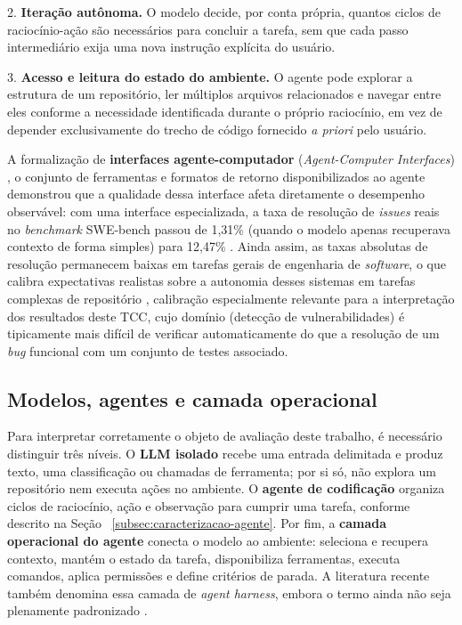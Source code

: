 2. \textbf{Iteração autônoma.} O modelo decide, por conta própria, quantos ciclos de raciocínio-ação são necessários para concluir a tarefa, sem que cada passo intermediário exija uma nova instrução explícita do usuário.

3. \textbf{Acesso e leitura do estado do ambiente.} O agente pode explorar a estrutura de um repositório, ler múltiplos arquivos relacionados e navegar entre eles conforme a necessidade identificada durante o próprio raciocínio, em vez de depender exclusivamente do trecho de código fornecido \textit{a priori} pelo usuário.

A formalização de \textbf{interfaces agente-computador} (\textit{Agent-Computer Interfaces}) , o conjunto de ferramentas e formatos de retorno disponibilizados ao agente demonstrou que a qualidade dessa interface afeta diretamente o desempenho observável: com uma interface especializada, a taxa de resolução de \textit{issues} reais no \textit{benchmark} SWE-bench passou de 1,31\% (quando o modelo apenas recuperava contexto de forma simples) para 12,47\% \cite{Yang2024SWEagent, Jimenez2024SWEbench}. Ainda assim, as taxas absolutas de resolução permanecem baixas em tarefas gerais de engenharia de \textit{software}, o que calibra expectativas realistas sobre a autonomia desses sistemas em tarefas complexas de repositório \cite{Jimenez2024SWEbench} , calibração especialmente relevante para a interpretação dos resultados deste TCC, cujo domínio (detecção de vulnerabilidades) é tipicamente mais difícil de verificar automaticamente do que a resolução de um \textit{bug} funcional com um conjunto de testes associado.

\subsection{Modelos, agentes e camada operacional}\label{subsec:camada-operacional-agente}
Para interpretar corretamente o objeto de avaliação deste trabalho, é necessário distinguir três níveis. O \textbf{LLM isolado} recebe uma entrada delimitada e produz texto, uma classificação ou chamadas de ferramenta; por si só, não explora um repositório nem executa ações no ambiente. O \textbf{agente de codificação} organiza ciclos de raciocínio, ação e observação para cumprir uma tarefa, conforme descrito na Seção ~\ref{subsec:caracterizacao-agente}. Por fim, a \textbf{camada operacional do agente} conecta o modelo ao ambiente: seleciona e recupera contexto, mantém o estado da tarefa, disponibiliza ferramentas, executa comandos, aplica permissões e define critérios de parada. A literatura recente também denomina essa camada de \textit{agent harness}, embora o termo ainda não seja plenamente padronizado \cite{Yang2024SWEagent, Macedo2026AgentHarness}.

